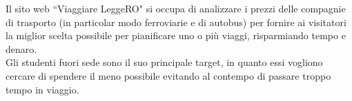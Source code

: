 \documentclass[main.tex]{subfiles}
\begin{document}
Il sito web ``Viaggiare LeggeRO" si occupa di analizzare i prezzi delle compagnie di trasporto (in particolar modo ferroviarie e di autobus) per fornire
ai visitatori la miglior scelta possibile per pianificare uno o più viaggi, risparmiando tempo e denaro.\\
Gli studenti fuori sede sono il suo principale target, in quanto essi vogliono cercare di spendere il meno possibile evitando al contempo di passare troppo tempo in viaggio.
\end{document}
